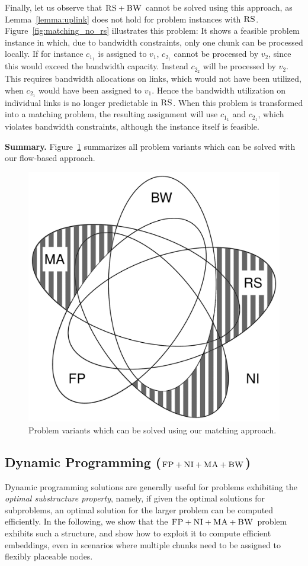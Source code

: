 \documentclass[9pt]{sigcomm-alternate}
\newcommand{\VirtualNode}{v}
\newcommand{\achunk}{\ensuremath{c}}
\newcommand{\CC}{\textsc{NI}}
\newcommand{\FP}{\textsc{FP}}
\newcommand{\RS}{\textsc{RS}}
\newcommand{\BW}{\textsc{BW}}
\newcommand{\MA}{\textsc{MA}}
\begin{document}
Finally, let us observe that $\RS+\BW$ cannot be solved using this approach, 
as Lemma~\ref{lemma:uplink} does not
hold for problem instances with $\RS$. Figure~\ref{fig:matching_no_rs}
illustrates this problem: It shows a feasible problem instance in which, due
to bandwidth constraints, only one chunk can be processed locally. If for
instance $\achunk_{1_1}$ is assigned to $\VirtualNode_1$, $\achunk_{2_1}$ cannot
be processed by $\VirtualNode_2$, since this would exceed the bandwidth
capacity. Instead $\achunk_{2_2}$ will be processed by $\VirtualNode_2$. This
requires bandwidth allocations on links, which would not have been utilized,
when $\achunk_{2_1}$ would have been assigned to $\VirtualNode_1$. Hence the
bandwidth utilization on individual links is no longer predictable in $\RS$.
When this problem is transformed into a matching problem, the resulting
assignment will use $\achunk_{1_1}$ and $\achunk_{2_1}$, which violates
bandwidth constraints, although the instance itself is feasible.

\textbf{Summary.}
Figure~\ref{fig:venn_match} summarizes all problem
variants which can be solved with our flow-based approach.
\begin{figure}
\includegraphics[width=0.48\columnwidth]{figs/venn_matching.pdf}
\caption{Problem variants which can be solved using our matching approach.}
\label{fig:venn_match}
\end{figure}


\subsection{Dynamic Programming ($\FP+\CC+\MA+\BW$)}\label{ssec:dyn}

Dynamic programming solutions are generally useful for problems
exhibiting the \emph{optimal substructure property}, namely, if given
the optimal solutions for subproblems, an optimal solution for the
larger problem can be computed efficiently.
In the following, we show that the $\FP+\CC+\MA+\BW$ problem
exhibits such a structure, and show how to exploit it to
compute efficient embeddings, even in scenarios where multiple chunks
need to be assigned to flexibly placeable nodes.
\end{document}
